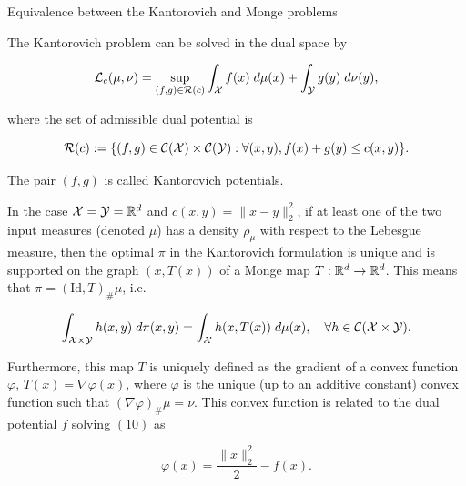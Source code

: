 \begin{frame}{Equivalence between the Kantorovich and Monge problems}
    \scriptsize
    \vspace{-.6em}
    \begin{Thm}
        The Kantorovich problem can be solved in the dual space by

        \vspace{-.7em}
        \begin{equation}
            \mathcal{L}_c(\mu,\nu)=\sup_{(f,g)\in \mathcal{R}(c)} 
            \int_{\mathcal{X}} f(x)\;d\mu(x) + \int_{\mathcal{Y}} g(y)\;d\nu(y),
            \label{equ:KantorovichDual}
        \end{equation}

        \vspace{-.4em}
        where the set of admissible dual potential is

        \vspace{-.4em}
        \begin{equation}
            \mathcal{R}(c) := \{(f,g) \in \mathcal{C}(\mathcal{X})\times\mathcal{C}(\mathcal{Y}) : 
            \forall (x,y), f(x)+g(y)\leq c(x,y)\}.
        \end{equation}

        \vspace{-.4em}
        The pair $(f,g)$ is called Kantorovich potentials.
    \end{Thm}

    \pause
    \begin{Thm}
        In the case $\mathcal{X}=\mathcal{Y}=\mathbb{R}^d$ and $c(x, y) =\|x-y\|_2^2$, 
        if at least one of the two input measures (denoted $\mu$) 
        has a density $\rho_\mu$ with respect to the Lebesgue measure, 
        then the optimal $\pi$ in the Kantorovich formulation is unique 
        and is supported on the graph $(x, T (x))$ of a Monge map
        $T : \mathbb{R}^d \to \mathbb{R}^d$. This means that $\pi = (\text{Id}, T)_\#\mu$, 
        i.e.

        \vspace{-.4em}
        \begin{equation}
            \int_{\mathcal{X}\times \mathcal{Y}} h(x,y)\;d\pi(x,y)=\int_{\mathcal{X}} h(x,T(x))\;d\mu(x),
            \quad \forall h\in\mathcal{C}(\mathcal{X}\times \mathcal{Y}).
        \end{equation}

        \vspace{-.4em}
        Furthermore, this map $T$ is uniquely defined as the gradient 
        of a convex function $\varphi$, $T (x) = \nabla \varphi(x)$, 
        where $\varphi$ is the unique (up to an additive constant) convex 
        function such that $(\nabla\varphi)_\#\mu = \nu$. This convex 
        function is related to the dual potential $f$ solving 
        $(10)$ as

        \vspace{-.4em}
        \begin{equation}
            \varphi(x)=\frac{\| x\|_2^2}{2} - f(x).
        \end{equation}
    \end{Thm}
\end{frame}